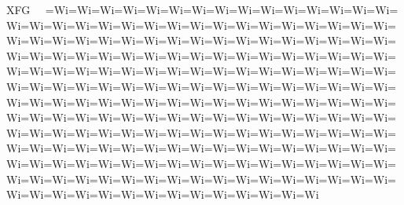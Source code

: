 XFG                        =Wi =Wi =Wi =Wi =Wi =Wi =Wi =Wi =Wi =Wi =Wi =Wi =Wi =Wi =Wi =Wi =Wi =Wi =Wi =Wi =Wi =Wi =Wi =Wi =Wi =Wi =Wi =Wi =Wi =Wi =Wi =Wi =Wi =Wi =Wi =Wi =Wi =Wi =Wi =Wi =Wi =Wi =Wi =Wi =Wi =Wi =Wi =Wi =Wi =Wi =Wi =Wi =Wi =Wi =Wi =Wi =Wi =Wi =Wi =Wi =Wi =Wi =Wi =Wi =Wi =Wi =Wi =Wi =Wi =Wi =Wi =Wi =Wi =Wi =Wi =Wi =Wi =Wi =Wi =Wi =Wi =Wi =Wi =Wi =Wi =Wi =Wi =Wi =Wi =Wi =Wi =Wi =Wi =Wi =Wi =Wi =Wi =Wi =Wi =Wi =Wi =Wi =Wi =Wi =Wi =Wi =Wi =Wi =Wi =Wi =Wi =Wi =Wi =Wi =Wi =Wi =Wi =Wi =Wi =Wi =Wi =Wi =Wi =Wi =Wi =Wi =Wi =Wi =Wi =Wi =Wi =Wi =Wi =Wi =Wi =Wi =Wi =Wi =Wi =Wi =Wi =Wi =Wi =Wi =Wi =Wi =Wi =Wi =Wi =Wi =Wi =Wi =Wi =Wi =Wi =Wi =Wi =Wi =Wi =Wi =Wi =Wi =Wi =Wi =Wi =Wi =Wi =Wi =Wi =Wi =Wi =Wi =Wi =Wi =Wi =Wi =Wi =Wi =Wi =Wi =Wi =Wi =Wi =Wi =Wi =Wi =Wi =Wi =Wi =Wi =Wi =Wi =Wi =Wi =Wi =Wi =Wi =Wi =Wi =Wi =Wi =Wi =Wi =Wi =Wi =Wi =Wi =Wi =Wi =Wi =Wi =Wi =Wi =Wi =Wi =Wi 